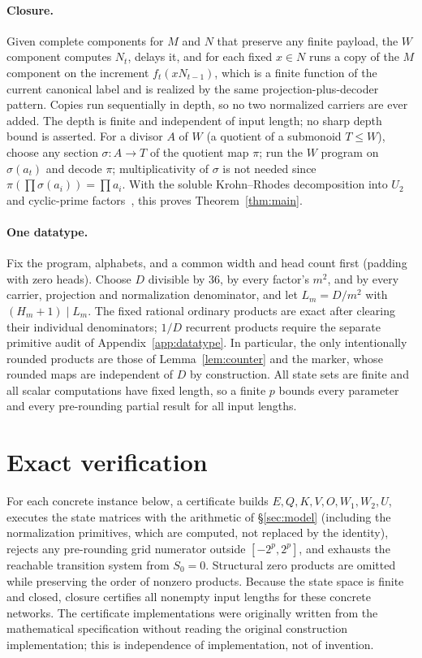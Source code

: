 \documentclass[10pt]{article}
\theoremstyle{remark}
\begin{document}
\paragraph{Closure.} Given complete components for $M$ and $N$ that preserve any finite payload, the $W$ component computes $N_t$, delays it, and for each fixed $x\in N$ runs a copy of the $M$ component on the increment $f_t(xN_{t-1})$, which is a finite function of the current canonical label and is realized by the same projection-plus-decoder pattern. Copies run sequentially in depth, so no two normalized carriers are ever added. The depth is finite and independent of input length; no sharp depth bound
is asserted. For a divisor $A$ of $W$ (a quotient of a submonoid $T\le W$), choose any section $\sigma:A\to T$ of the quotient map $\pi$; run the $W$ program on $\sigma(a_t)$ and decode $\pi$; multiplicativity of $\sigma$ is not needed since $\pi(\prod\sigma(a_i))=\prod a_i$. With the soluble Krohn--Rhodes decomposition into $U_2$ and cyclic-prime factors~\citep[Prop.~1, Def.~8]{statebench}, this proves Theorem~\ref{thm:main}.

\paragraph{One datatype.} Fix the program, alphabets, and a common width and head count first (padding with zero heads). Choose $D$ divisible by $36$, by every factor's $m^2$, and by every carrier, projection and normalization denominator, and let $L_m=D/m^2$ with $(H_m+1)\mid L_m$. The fixed rational ordinary products are exact after clearing their
individual denominators; $1/D$ recurrent products require the separate
primitive audit of Appendix~\ref{app:datatype}. In particular, the only intentionally rounded products are those of Lemma~\ref{lem:counter} and the marker, whose rounded maps are independent of $D$ by construction. All state sets are finite and all scalar computations have fixed length, so a finite $p$ bounds every parameter and every pre-rounding partial result for all input lengths.

\section{Exact verification}\label{sec:verify}

For each concrete instance below, a certificate builds $E,Q,K,V,O,W_1,W_2,U$, executes the state matrices with the arithmetic of \S\ref{sec:model} (including the normalization primitives, which are computed, not replaced by the identity), rejects any pre-rounding grid numerator outside $[-2^p,2^p]$, and exhausts the reachable transition system from $S_0=0$. Structural zero products are omitted while preserving the order of nonzero
products. Because the state space is finite and closed, closure certifies all
nonempty input lengths for these concrete networks. The certificate implementations were originally written from the mathematical
specification without reading the original construction implementation; this is independence of implementation, not of invention.
\end{document}
